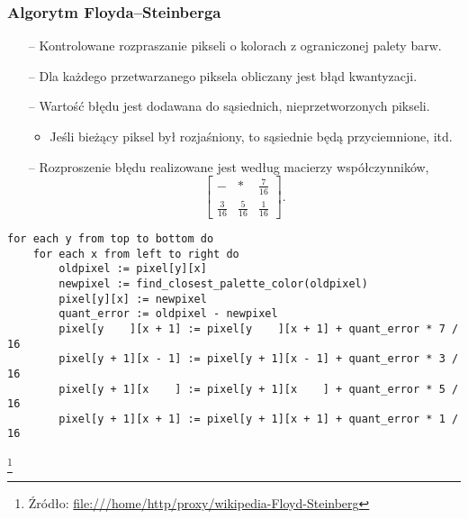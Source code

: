 \documentclass[usenames,dvipsnames,aspectratio=43,presentation]{beamer}
\begin{document}
    \begin{frame}[fragile]
        \frametitle{Algorytm Floyda–Steinberga}
        \footnotesize

        \begin{itemize}
            \item[--] Kontrolowane rozpraszanie pikseli o kolorach z ograniczonej palety barw.
            \item[--] Dla każdego przetwarzanego piksela obliczany jest błąd kwantyzacji.
            \item[--] Wartość błędu jest dodawana do sąsiednich, nieprzetworzonych pikseli.
                      \begin{itemize}
                          \scriptsize
                          \item Jeśli bieżący piksel był rozjaśniony, to sąsiednie będą przyciemnione, itd.
                      \end{itemize}
            \item[--] Rozproszenie błędu realizowane jest według macierzy współczynników,
                      \begin{equation*}
                          \begin{bmatrix}
                              -            & *            & \frac{7}{16} \\
                              \frac{3}{16} & \frac{5}{16} & \frac{1}{16}
                          \end{bmatrix}
                          \mathrm{.}
                      \end{equation*}
        \end{itemize}

        \vspace{-0.5em}

        \begin{minipage}{\textwidth}
            \label{fs-code}
            \begin{verbatim}
for each y from top to bottom do
    for each x from left to right do
        oldpixel := pixel[y][x]
        newpixel := find_closest_palette_color(oldpixel)
        pixel[y][x] := newpixel
        quant_error := oldpixel - newpixel
        pixel[y    ][x + 1] := pixel[y    ][x + 1] + quant_error * 7 / 16
        pixel[y + 1][x - 1] := pixel[y + 1][x - 1] + quant_error * 3 / 16
        pixel[y + 1][x    ] := pixel[y + 1][x    ] + quant_error * 5 / 16
        pixel[y + 1][x + 1] := pixel[y + 1][x + 1] + quant_error * 1 / 16
            \end{verbatim}
        \end{minipage}

        \let\thefootnote\relax\footnote[frame]{
            \tiny
            \hspace{-3.25em}
            Źródło:
            \url{file:///home/http/proxy/wikipedia-Floyd-Steinberg}
        }
    \end{frame}
\end{document}
